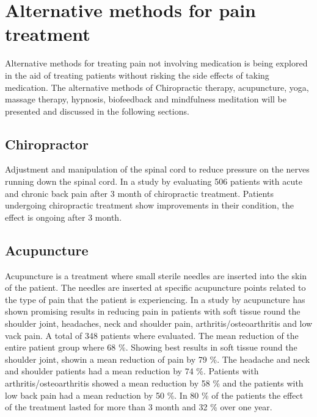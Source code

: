 \section{Alternative methods for pain treatment}
Alternative methods for treating pain not involving medication is being explored in the aid of treating patients without risking the side effects of taking medication. The alternative methods of Chiropractic therapy, acupuncture, yoga,  massage therapy, hypnosis, biofeedback and mindfulness meditation will be presented and discussed in the following sections. 

\subsection{Chiropractor}
Adjustment and manipulation of the spinal cord to reduce pressure on the nerves running down the spinal cord.
In a study by \cite{Peterson2012} evaluating 506 patients with acute and chronic back pain after 3 month of chiropractic treatment.
Patients undergoing chiropractic treatment show improvements in their condition, the effect is ongoing after 3 month. \cite{Peterson2012}

\subsection{Acupuncture}
Acupuncture is a treatment where small sterile needles are inserted into the skin of the patient. The needles are inserted at specific acupuncture points related to the type of pain that the patient is experiencing. \cite{Dhanani2011} 
In a study by \cite{Junnilla1983} acupuncture has shown promising results in reducing pain in patients with soft tissue round the shoulder joint, headaches, neck and shoulder pain, arthritis/osteoarthritis and low vack pain. A total of 348 patients where evaluated. The mean reduction of the entire patient group where 68 \%. Showing best results in soft tissue round the shoulder joint, showin a mean reduction of pain by 79 \%. The headache and neck and shoulder patients had a mean reduction by 74 \%. Patients with  arthritis/osteoarthritis showed a mean reduction by 58 \% and the patients with low back pain had a mean reduction by 50 \%. In 80 \% of the patients the effect of the treatment lasted for more than 3 month and 32 \% over one year. \cite{Junnilla1983}

